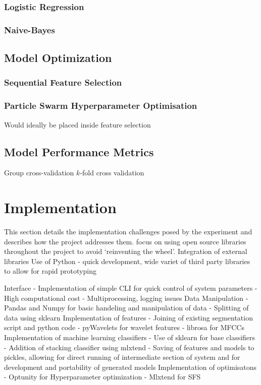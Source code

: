 \documentclass[titlepage, 12pt]{scrartcl} \usepackage{enumitem}
\begin{document}
\subsubsection{Logistic Regression}

\subsubsection{Naive-Bayes}


\subsection{Model Optimization}\label{optimise}

\subsubsection{Sequential Feature Selection}

\subsubsection{Particle Swarm Hyperparameter Optimisation}
Would ideally be placed inside feature selection


\subsection{Model Performance Metrics}\label{metrics}
Group cross-validation
$k$-fold cross validation

\section{Implementation}
This section details the implementation challenges posed by the experiment and describes how the project addresses them.
focus on using open source libraries throughout the project to avoid
`reinventing the wheel'. Integration of external libraries
Use of Python - quick development, wide variet of third party libraries to
allow for rapid prototyping

Interface
- Implementation of simple CLI for quick control of system parameters
- High computational cost - Multiprocessing, logging issues
Data Manipulation
- Pandas and Numpy for basic handeling and manipulation of data
- Splitting of data using sklearn
Implementation of features
- Joining of existing segmentation script and python code
- pyWavelets for wavelet features
- librosa for MFCCs
Implementation of machine learning classifiers
- Use of sklearn for base classifiers
- Addition of stacking classifier using mlxtend
- Saving of features and models to pickles, allowing for direct running of
intermediate section of system and for development and portability of generated models
Implementation of optimisatons
- Optunity for Hyperparameter optimization
- Mlxtend for SFS
\end{document}
